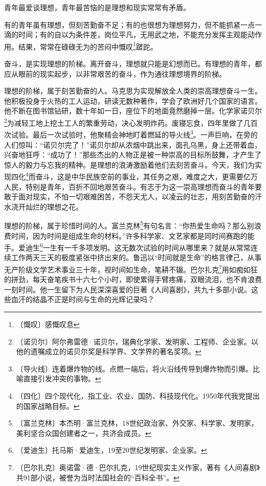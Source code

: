 \documentclass[12pt,UTF-8,openany]{ctexbook}
\begin{document}
\begin{normalsize}
    
    青年最爱谈理想，青年最苦恼的是理想和现实常常有矛盾。
    
    有的青年虽有理想，但刻苦勤奋不足；有的也很想为理想努力，但不能抓紧一点一滴的时间；有的自以为条件差，岗位平凡，无用武之地，不能充分发挥主观能动作用。结果，常常在碌碌无为的苦闷中慨叹\footnote{〔慨叹〕感慨叹息}蹉跎。
    
    奋斗，是实现理想的阶梯。离开奋斗，理想就只能是幻想而已。有理想的青年，都应从眼前的现实起步，以非常艰苦的奋斗，作为通往理想境界的阶梯。
    
    理想的阶梯，属于刻苦勤奋的人。马克思为实现解放全人类的崇高理想奋斗一生。他积极投身于火热的工人运动，研读无数种著作，学会了欧洲好几个国家的语言。他不断在图书馆钻研，数十年如一日，座位下的地面竟然磨掉一层。化学家诺贝尔\footnote{〔诺贝尔〕阿尔弗雷德·诺贝尔，瑞典化学家、发明家、工程师、企业家。以他的遗嘱成立的诺贝尔奖是科学界、文学界的著名奖项。}为减轻工地上挖土工人的繁重劳动，决心发明炸药。废寝忘食，四年里做了几百次试验。最后一次试验时，他聚精会神地盯着燃延的导火线\footnote{〔导火线〕连着爆炸物的线。点燃一端后，将火沿线传导到爆炸物而引爆。比喻直接引发冲突的事物。}。一声巨响，在旁的人们惊叫：“诺贝尔完了！”诺贝尔却从浓烟中跳出来，面孔乌黑，身上还带着血，兴奋地狂呼：“成功了！”那些杰出的人物正是被一种崇高的目标所鼓舞，才产生了惊人的毅力与忘我的精神。是理想的浪涛激励着他们去刻苦奋斗。今天，我们为实现四化\footnote{〔四化〕四个现代化，指工业、农业、国防、科技现代化。1950年代我党提出的国家战略目标。}而奋斗，这是中华民族空前的事业，其任务之艰，难度之大，更需要亿万人民，特别是青年，百折不回地艰苦奋斗。有志于为这一崇高理想而奋斗的青年要敢于面对现实，不怕一切艰难困苦，不怨天尤人，以凌云的壮志，用刻苦勤奋的汗水浇开灿烂的理想之花。
    
    理想的阶梯，属于珍惜时间的人。富兰克林\footnote{〔富兰克林〕本杰明·富兰克林，18世纪政治家、外交家、科学家、发明家，美利坚合众国创建者之一，共济会成员。}有句名言：“你热爱生命吗？那么别浪费时间，因为时间是组成生命的材料。”许多科学家、文艺家都是同时间赛跑的能手。爱迪生\footnote{〔爱迪生〕托马斯·爱迪生，19至20世纪发明家、企业家。}一生有一千多项发明。这无数次试验的时间从哪里来？就是从常常连续工作两天三天的极度紧张中挤出来的。鲁迅以“时间就是生命”的格言律己，从事无产阶级文学艺术事业三十年，视时间如生命，笔耕不辍。巴尔扎克\footnote{〔巴尔扎克〕奥诺雷·德·巴尔扎克，19世纪现实主义作家，著有《人间喜剧》共91部小说，被誉为当时法国社会的“百科全书”。}用如痴如狂的拼劲，每天奋笔疾书十六七个小时，即使累得手臂疼痛，双眼流泪，也不肯浪费一刻时间。他一生留下为人民深深喜爱的巨著《人间喜剧》，共九十多部小说。这些血汗的结晶不正是时间与生命的光辉记录吗？
    

\end{normalsize}
\end{document}

